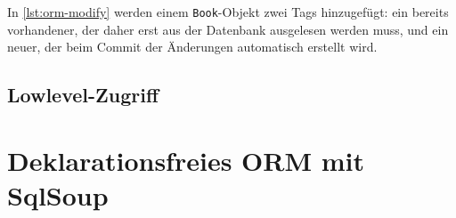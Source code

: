 In \autoref{lst:orm-modify} werden einem \texttt{Book}-Objekt zwei Tags
hinzugefügt: ein bereits vorhandener, der daher erst aus der Datenbank
ausgelesen werden muss, und ein neuer, der beim Commit der Änderungen
automatisch erstellt wird.



\subsection{Lowlevel-Zugriff}

\section{Deklarationsfreies ORM mit SqlSoup}

